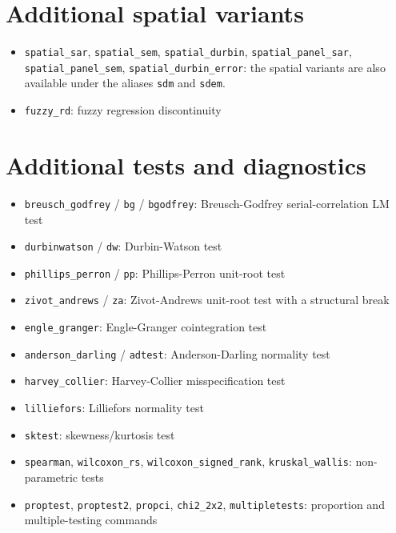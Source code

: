 \section{Additional spatial variants}

\begin{itemize}
\item \texttt{spatial\_sar}, \texttt{spatial\_sem}, \texttt{spatial\_durbin},
      \texttt{spatial\_panel\_sar}, \texttt{spatial\_panel\_sem},
      \texttt{spatial\_durbin\_error}: the spatial variants are also
      available under the aliases \texttt{sdm} and \texttt{sdem}.
\item \texttt{fuzzy\_rd}: fuzzy regression discontinuity
\end{itemize}

\section{Additional tests and diagnostics}

\begin{itemize}
\item \texttt{breusch\_godfrey} / \texttt{bg} / \texttt{bgodfrey}:
      Breusch-Godfrey serial-correlation LM test
\item \texttt{durbinwatson} / \texttt{dw}: Durbin-Watson test
\item \texttt{phillips\_perron} / \texttt{pp}: Phillips-Perron unit-root test
\item \texttt{zivot\_andrews} / \texttt{za}: Zivot-Andrews unit-root test with
      a structural break
\item \texttt{engle\_granger}: Engle-Granger cointegration test
\item \texttt{anderson\_darling} / \texttt{adtest}: Anderson-Darling normality
      test
\item \texttt{harvey\_collier}: Harvey-Collier misspecification test
\item \texttt{lilliefors}: Lilliefors normality test
\item \texttt{sktest}: skewness/kurtosis test
\item \texttt{spearman}, \texttt{wilcoxon\_rs}, \texttt{wilcoxon\_signed\_rank},
      \texttt{kruskal\_wallis}: non-parametric tests
\item \texttt{proptest}, \texttt{proptest2}, \texttt{propci}, \texttt{chi2\_2x2},
      \texttt{multipletests}: proportion and multiple-testing commands
\end{itemize}

